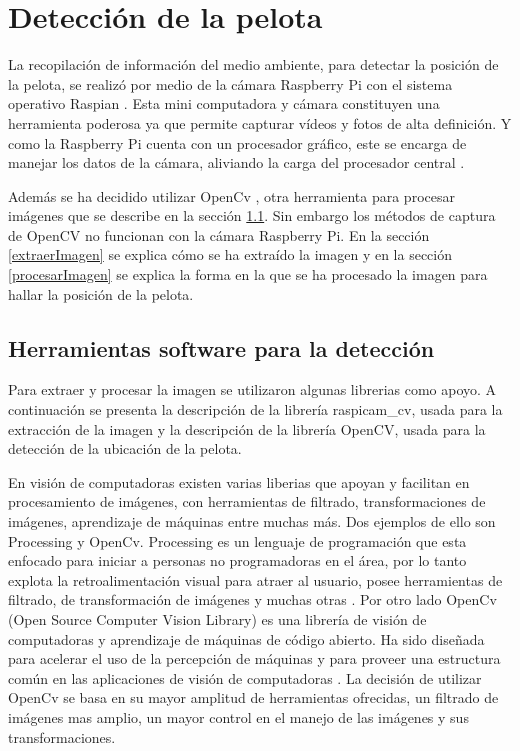 \section{Detección de la pelota}\label{chapter:deteccion}

La recopilación de información del medio ambiente, para detectar la posición de la pelota, se realiz\'o por medio de la cámara Raspberry Pi con el sistema operativo Raspian \cite{raspian}. Esta mini computadora y cámara constituyen una herramienta poderosa ya que permite capturar v\'ideos y fotos de alta definici\'on. Y como la Raspberry Pi cuenta con un procesador gr\'afico, este se encarga de manejar los datos de la cámara, aliviando la carga del procesador central \cite{raspCamArti}.

Además se ha decidido utilizar OpenCv \cite{opencv}, otra herramienta para procesar im\'agenes que se describe en la sección \ref{herramientasDetc}. Sin embargo los métodos de captura de OpenCV no funcionan con la c\'amara Raspberry Pi. En la secci\'on \ref{extraerImagen} se explica c\'omo se ha extra\'ido la imagen y en la secci\'on \ref{procesarImagen} se explica la forma en la que se ha procesado la imagen para hallar la posición de la pelota. 

\subsection{Herramientas software para la detecci\'on }\label{herramientasDetc}

Para extraer y procesar la imagen se utilizaron algunas librerias como apoyo. A continuación se presenta la descripción de la librería raspicam\_cv, usada para la extracción de la imagen y la descripción de la librería OpenCV, usada para la detección de la ubicación de la pelota.   

En visi\'on de computadoras existen varias liberias que apoyan y facilitan en procesamiento de im\'agenes, con herramientas de filtrado, transformaciones de im\'agenes, aprendizaje de m\'aquinas entre muchas m\'as. Dos ejemplos de ello son Processing \cite{processing} y OpenCv. Processing es un lenguaje de programaci\'on que esta enfocado para iniciar a personas no programadoras en el \'area, por lo tanto explota la retroalimentaci\'on visual para atraer al usuario, posee herramientas de filtrado, de transformaci\'on de im\'agenes y muchas otras .
Por otro lado OpenCv (Open Source Computer Vision Library) es una librería de visión de computadoras y aprendizaje de máquinas de código abierto. Ha sido diseñada para acelerar el uso de la percepción de m\'aquinas y para proveer una estructura común en las aplicaciones de visión de computadoras \cite{opencv}. La decisi\'on de utilizar OpenCv se basa en su mayor amplitud de herramientas ofrecidas, un filtrado de im\'agenes mas amplio, un mayor control en el manejo de las im\'agenes y sus transformaciones.

